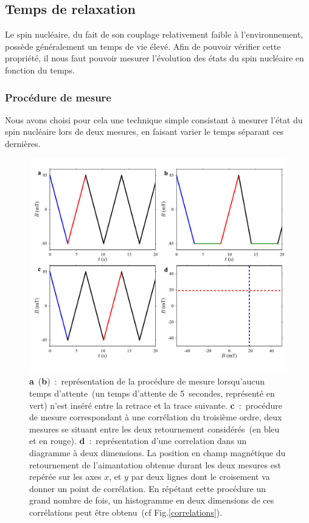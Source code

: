 \subsection{Temps de relaxation}

Le spin nucléaire, du fait de son couplage relativement faible à l’environnement, possède généralement un temps de vie élevé. Afin de pouvoir vérifier cette propriété, il nous faut pouvoir mesurer l'évolution des états du spin nucléaire en fonction du temps. 

\subsubsection{Procédure de mesure}
Nous avons choisi pour cela une technique simple consistant à mesurer l'état du spin nucléaire lors de deux mesures, en faisant varier le temps séparant ces dernières.

\begin{figure}
\centering \includegraphics[scale=0.45]{Resultats/PostFig1/postfig1.pdf} 
\caption{\textbf{a}~(\textbf{b})~:~représentation de la procédure de mesure lorsqu'aucun temps d'attente~(un temps d'attente de 5\, secondes, représenté en vert) n'est inséré entre la retrace et la trace suivante. \textbf{c}~:~procédure de mesure correspondant à une corrélation du troisième ordre, deux mesures se situant entre les deux retournement considérés~(en bleu et en rouge). \textbf{d}~:~représentation d'une correlation dans un diagramme à deux dimensions.  La position en champ magnétique du retournement de l'aimantation obtenue durant les deux mesures est repérée sur les axes $x$, et $y$ par deux lignes dont le croisement va donner un point de corrélation. En répétant cette procédure un grand nombre de fois, un histogramme en deux dimensions de ces corrélations peut être obtenu~(cf Fig.\ref{correlations}).}
\label{procedure}
\end{figure}



